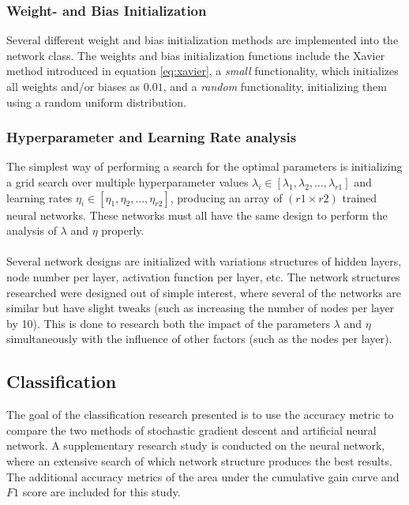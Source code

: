         \subsubsection{Weight- and Bias Initialization}
            Several different weight and bias initialization methods are implemented into the network class. The weights and bias initialization functions include the Xavier method introduced in equation \ref{eq:xavier}, a \textit{small} functionality, which initializes all weights and/or biases as $0.01$, and a \textit{random} functionality, initializing them using a random uniform distribution.
            
        \subsubsection{Hyperparameter and Learning Rate analysis}
            The simplest way of performing a search for the optimal parameters is initializing a grid search over multiple hyperparameter values $\lambda_i \in [\lambda_1, \lambda_2, \hdots, \lambda_{r1}]$ and learning rates $\eta_i \in [\eta_1, \eta_2, \hdots, \eta_{r2}]$, producing an array of $(r1 \times r2)$ trained neural networks. These networks must all have the same design to perform the analysis of $\lambda$ and $\eta$ properly.\\\\
            Several network designs are initialized with variations structures of hidden layers, node number per layer, activation function per layer, etc. The network structures researched were designed out of simple interest, where several of the networks are similar but have slight tweaks (such as increasing the number of nodes per layer by 10). This is done to research both the impact of the parameters $\lambda$ and $\eta$ simultaneously with the influence of other factors (such as the nodes per layer).
          
    \subsection{Classification}
        The goal of the classification research presented is to use the accuracy metric to compare the two methods of stochastic gradient descent and artificial neural network. A supplementary research study is conducted on the neural network, where an extensive search of which network structure produces the best results. The additional accuracy metrics of the area under the cumulative gain curve and $F1$ score are included for this study.
